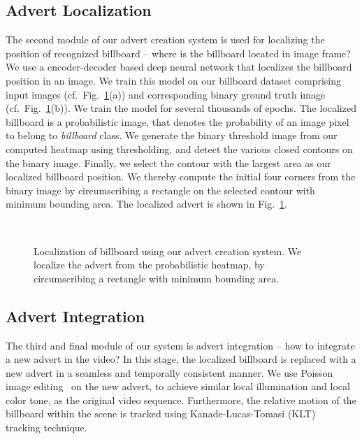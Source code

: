 \documentclass[runningheads]{llncs}
\begin{document}
\vspace{-0.2in}

\subsection{Advert Localization}
The second module of our advert creation system is used for localizing the position of recognized billboard -- where is the billboard located in image frame? We use a encoder-decoder based deep neural network that localizes the billboard position in an image. We train this model on our billboard dataset comprising input images (cf.\ Fig.\ \ref{fig:locate-advert}(a)) and corresponding binary ground truth image (cf.\ Fig.\ \ref{fig:locate-advert}(b)). We train the model for several thousands of epochs. The localized billboard is a probabilistic image, that denotes the probability of an image pixel to belong to \emph{billboard} class. We generate the binary threshold image from our computed heatmap using thresholding, and detect the various closed contours on the binary image. Finally, we select the contour with the largest area as our localized billboard position. We thereby compute the initial four corners from the binary image by circumscribing a rectangle on the selected contour with minimum bounding area. The localized advert is shown in Fig.\ \ref{fig:locate-advert}.

\begin{figure}
\vspace{-0.2in}
\centering
{}\ 
\ 
\ 
\caption{Localization of billboard using our advert creation system. We localize the advert from the probabilistic heatmap, by circumscribing a rectangle with minimum bounding area.}
\label{fig:locate-advert}
\vspace{-0.5in}
\end{figure}


\subsection{Advert Integration}
The third and final module of our system is advert integration -- how to integrate a new advert in the video? In this stage, the localized billboard is replaced with a new advert in a seamless and temporally consistent manner. We use Poisson image editing~\cite{perez2003poisson} on the new advert, to achieve similar local illumination and local color tone, as the original video sequence. Furthermore, the relative motion of the billboard within the scene is tracked using Kanade-Lucas-Tomasi (KLT)~\cite{lucas1981an} tracking technique.
\end{document}
